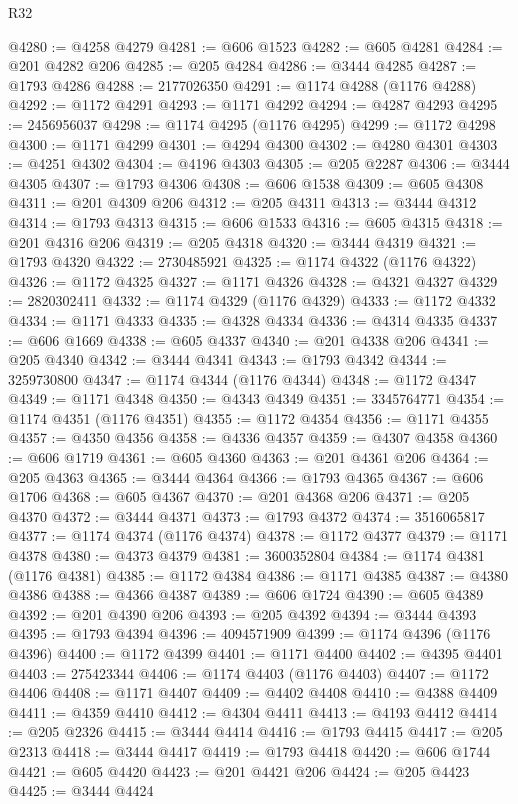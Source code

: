\begin{lexlean}{R32}
\begin{coremodule}
@4280 := @4258 @4279
@4281 := @606 @1523
@4282 := @605 @4281
@4284 := @201 @4282 @206
@4285 := @205 @4284
@4286 := @3444 @4285
@4287 := @1793 @4286
@4288 := 2177026350
@4291 := @1174 @4288 (@1176 @4288)
@4292 := @1172 @4291
@4293 := @1171 @4292
@4294 := @4287 @4293
@4295 := 2456956037
@4298 := @1174 @4295 (@1176 @4295)
@4299 := @1172 @4298
@4300 := @1171 @4299
@4301 := @4294 @4300
@4302 := @4280 @4301
@4303 := @4251 @4302
@4304 := @4196 @4303
@4305 := @205 @2287
@4306 := @3444 @4305
@4307 := @1793 @4306
@4308 := @606 @1538
@4309 := @605 @4308
@4311 := @201 @4309 @206
@4312 := @205 @4311
@4313 := @3444 @4312
@4314 := @1793 @4313
@4315 := @606 @1533
@4316 := @605 @4315
@4318 := @201 @4316 @206
@4319 := @205 @4318
@4320 := @3444 @4319
@4321 := @1793 @4320
@4322 := 2730485921
@4325 := @1174 @4322 (@1176 @4322)
@4326 := @1172 @4325
@4327 := @1171 @4326
@4328 := @4321 @4327
@4329 := 2820302411
@4332 := @1174 @4329 (@1176 @4329)
@4333 := @1172 @4332
@4334 := @1171 @4333
@4335 := @4328 @4334
@4336 := @4314 @4335
@4337 := @606 @1669
@4338 := @605 @4337
@4340 := @201 @4338 @206
@4341 := @205 @4340
@4342 := @3444 @4341
@4343 := @1793 @4342
@4344 := 3259730800
@4347 := @1174 @4344 (@1176 @4344)
@4348 := @1172 @4347
@4349 := @1171 @4348
@4350 := @4343 @4349
@4351 := 3345764771
@4354 := @1174 @4351 (@1176 @4351)
@4355 := @1172 @4354
@4356 := @1171 @4355
@4357 := @4350 @4356
@4358 := @4336 @4357
@4359 := @4307 @4358
@4360 := @606 @1719
@4361 := @605 @4360
@4363 := @201 @4361 @206
@4364 := @205 @4363
@4365 := @3444 @4364
@4366 := @1793 @4365
@4367 := @606 @1706
@4368 := @605 @4367
@4370 := @201 @4368 @206
@4371 := @205 @4370
@4372 := @3444 @4371
@4373 := @1793 @4372
@4374 := 3516065817
@4377 := @1174 @4374 (@1176 @4374)
@4378 := @1172 @4377
@4379 := @1171 @4378
@4380 := @4373 @4379
@4381 := 3600352804
@4384 := @1174 @4381 (@1176 @4381)
@4385 := @1172 @4384
@4386 := @1171 @4385
@4387 := @4380 @4386
@4388 := @4366 @4387
@4389 := @606 @1724
@4390 := @605 @4389
@4392 := @201 @4390 @206
@4393 := @205 @4392
@4394 := @3444 @4393
@4395 := @1793 @4394
@4396 := 4094571909
@4399 := @1174 @4396 (@1176 @4396)
@4400 := @1172 @4399
@4401 := @1171 @4400
@4402 := @4395 @4401
@4403 := 275423344
@4406 := @1174 @4403 (@1176 @4403)
@4407 := @1172 @4406
@4408 := @1171 @4407
@4409 := @4402 @4408
@4410 := @4388 @4409
@4411 := @4359 @4410
@4412 := @4304 @4411
@4413 := @4193 @4412
@4414 := @205 @2326
@4415 := @3444 @4414
@4416 := @1793 @4415
@4417 := @205 @2313
@4418 := @3444 @4417
@4419 := @1793 @4418
@4420 := @606 @1744
@4421 := @605 @4420
@4423 := @201 @4421 @206
@4424 := @205 @4423
@4425 := @3444 @4424

\end{coremodule}
\end{lexlean}

